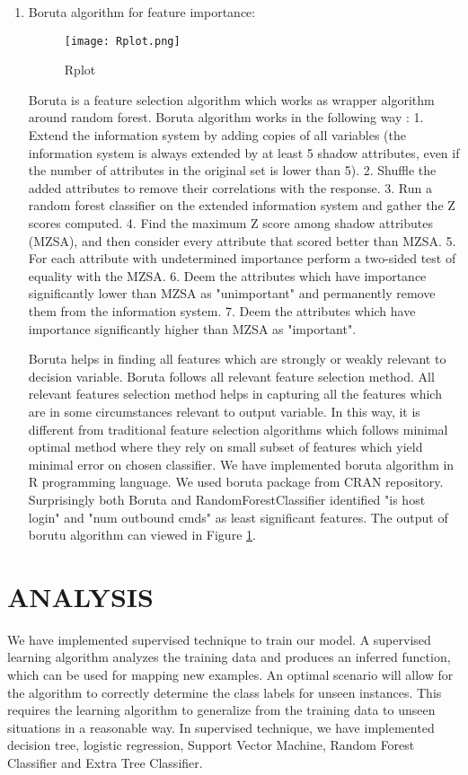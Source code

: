 \documentclass{acm_proc_article-sp}
\begin{document}
\begin{enumerate}
\begin{enumerate}
\item Boruta algorithm for feature importance:
\begin{figure}[h]
\texttt{[image: Rplot.png]}
\centering
\caption{Rplot}
\label{Rplot}
\end{figure}
Boruta is a feature selection algorithm which works as wrapper algorithm around random forest. Boruta algorithm works in the following way :
1. Extend the information system by adding copies of all variables (the information system
is always extended by at least 5 shadow attributes, even if the number of attributes in
the original set is lower than 5).
2. Shuffle the added attributes to remove their correlations with the response.
3. Run a random forest classifier on the extended information system and gather the
Z scores computed.
4. Find the maximum Z score among shadow attributes (MZSA), and then consider 
every attribute that scored better than MZSA.
5. For each attribute with undetermined importance perform a two-sided test of equality
with the MZSA.
6. Deem the attributes which have importance significantly lower than MZSA as "unimportant" and permanently remove them from the information system.
7. Deem the attributes which have importance significantly higher than MZSA as "important".

Boruta helps in finding all features which are strongly or weakly relevant to decision variable. Boruta follows all relevant feature selection method. All relevant features selection method helps in capturing all the features which are in some circumstances relevant to output variable. In this way, it is different from traditional feature selection algorithms which follows minimal optimal method where they rely on small subset of features which yield minimal error on chosen classifier.
We have implemented boruta algorithm in R programming language. We used boruta package from CRAN repository.
Surprisingly both Boruta and RandomForestClassifier identified "is host login" and  "num outbound cmds" as least significant features.
The output of borutu algorithm can viewed in Figure \ref{Rplot}.
\end{enumerate}
\end{enumerate}

\section{ANALYSIS}
We have implemented supervised technique to train our model. A supervised learning algorithm analyzes the training data and produces an inferred function, which can be used for mapping new examples. An optimal scenario will allow for the algorithm to correctly determine the class labels for unseen instances. This requires the learning algorithm to generalize from the training data to unseen situations in a reasonable way. In supervised technique, we have implemented decision tree, logistic regression, Support Vector Machine, Random Forest Classifier and Extra Tree Classifier.
\end{document}
